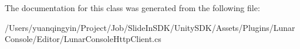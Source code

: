 The documentation for this class was generated from the following file\+:\begin{DoxyCompactItemize}
\item 
/\+Users/yuanqingyin/\+Project/\+Job/\+Slide\+In\+S\+D\+K/\+Unity\+S\+D\+K/\+Assets/\+Plugins/\+Lunar\+Console/\+Editor/Lunar\+Console\+Http\+Client.\+cs\end{DoxyCompactItemize}
